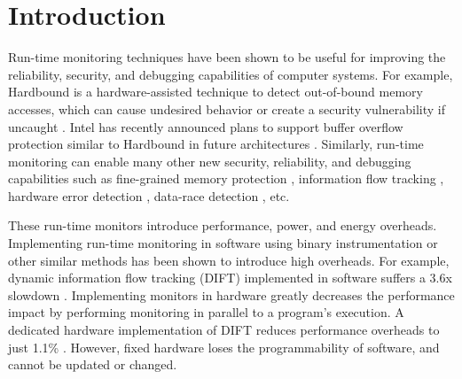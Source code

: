 \section{Introduction}
\label{sec:intro}

Run-time monitoring techniques have been shown to be useful for improving the
reliability, security, and debugging capabilities of computer systems. For
example, Hardbound is a hardware-assisted technique to detect out-of-bound
memory accesses, which can cause undesired behavior or create a security
vulnerability if uncaught \cite{hardbound-asplos08}.  Intel has
recently announced plans to support buffer overflow protection similar to
Hardbound in future architectures \cite{intel-mpx}. Similarly, run-time
monitoring can enable many other new security, reliability, and debugging
capabilities such as fine-grained memory protection \cite{mondrian-asplos02},
information flow tracking \cite{dift-asplos04, testudo-micro08}, hardware error
detection \cite{argus-micro07}, data-race detection \cite{radish-isca12,
cord-hpca06}, etc. 

These run-time monitors introduce performance, power, and energy overheads.
Implementing run-time monitoring in software using binary instrumentation or
other similar methods has been shown to introduce high overheads. For example,
dynamic information flow tracking (DIFT) implemented in software suffers a 3.6x
slowdown \cite{lift-micro06}. Implementing monitors in hardware greatly decreases
the performance impact by performing monitoring in parallel to a program's
execution. A dedicated hardware implementation of DIFT reduces performance
overheads to just 1.1\% \cite{dift-asplos04}. However, fixed hardware loses
the programmability of software, and cannot be updated or changed.


